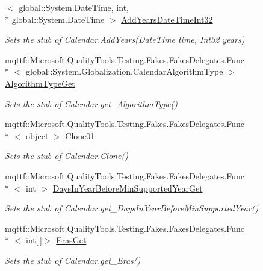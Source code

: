 \begin{DoxyCompactItemize}
$<$ global\-::\-System.\-Date\-Time, int, \\*
global\-::\-System.\-Date\-Time $>$ \hyperlink{class_system_1_1_globalization_1_1_fakes_1_1_stub_calendar_a6cff3ddc82aeca888103246a7dad4baf}{Add\-Years\-Date\-Time\-Int32}
\begin{DoxyCompactList}\small\item\em Sets the stub of Calendar.\-Add\-Years(\-Date\-Time time, Int32 years)\end{DoxyCompactList}\item 
mqttf\-::\-Microsoft.\-Quality\-Tools.\-Testing.\-Fakes.\-Fakes\-Delegates.\-Func\\*
$<$ global\-::\-System.\-Globalization.\-Calendar\-Algorithm\-Type $>$ \hyperlink{class_system_1_1_globalization_1_1_fakes_1_1_stub_calendar_a9e45355e1919f49f33d7761f07b61338}{Algorithm\-Type\-Get}
\begin{DoxyCompactList}\small\item\em Sets the stub of Calendar.\-get\-\_\-\-Algorithm\-Type()\end{DoxyCompactList}\item 
mqttf\-::\-Microsoft.\-Quality\-Tools.\-Testing.\-Fakes.\-Fakes\-Delegates.\-Func\\*
$<$ object $>$ \hyperlink{class_system_1_1_globalization_1_1_fakes_1_1_stub_calendar_a3f02f5f59320f7a86b386b3b1cd9af38}{Clone01}
\begin{DoxyCompactList}\small\item\em Sets the stub of Calendar.\-Clone()\end{DoxyCompactList}\item 
mqttf\-::\-Microsoft.\-Quality\-Tools.\-Testing.\-Fakes.\-Fakes\-Delegates.\-Func\\*
$<$ int $>$ \hyperlink{class_system_1_1_globalization_1_1_fakes_1_1_stub_calendar_af108c71360f5428f84367f2e883254bf}{Days\-In\-Year\-Before\-Min\-Supported\-Year\-Get}
\begin{DoxyCompactList}\small\item\em Sets the stub of Calendar.\-get\-\_\-\-Days\-In\-Year\-Before\-Min\-Supported\-Year()\end{DoxyCompactList}\item 
mqttf\-::\-Microsoft.\-Quality\-Tools.\-Testing.\-Fakes.\-Fakes\-Delegates.\-Func\\*
$<$ int\mbox{[}$\,$\mbox{]}$>$ \hyperlink{class_system_1_1_globalization_1_1_fakes_1_1_stub_calendar_a369ba962986a00c91ceefa51edab1d08}{Eras\-Get}
\begin{DoxyCompactList}\small\item\em Sets the stub of Calendar.\-get\-\_\-\-Eras()\end{DoxyCompactList}\item 

\end{DoxyCompactItemize}
